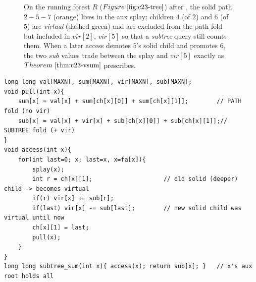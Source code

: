 \begin{figure}[H]
\centering
{}
\caption{On the running forest \(R\) (\(\figref{c23-tree}\)) after ,
the solid path \(2\!-\!5\!-\!7\) (orange) lives in the aux splay; children \(4\) (of
\(2\)) and \(6\) (of \(5\)) are \emph{virtual} (dashed green) and are excluded from
the path fold but included in \(\mathit{vir}[2]\), \(\mathit{vir}[5]\) so that a
\emph{subtree} query still counts them. When a later access demotes \(5\)'s solid
child and promotes \(6\), the two \(\mathit{sub}\) values trade between the splay and
\(\mathit{vir}[5]\) exactly as \(\thmref{c23-vsum}\) prescribes.}
\label{fig:c23-virtual}
\end{figure}

\begin{lstlisting}[caption={Subtree-sum-capable LCT: path fold sum[] (solid only) and subtree fold sub[] (solid + virtual) kept side by side. access() now updates vir[] as children swap between solid and virtual. ASCII only}, label={lst:c23-subtree}]
long long val[MAXN], sum[MAXN], vir[MAXN], sub[MAXN];
void pull(int x){
    sum[x] = val[x] + sum[ch[x][0]] + sum[ch[x][1]];        // PATH fold (no vir)
    sub[x] = val[x] + vir[x] + sub[ch[x][0]] + sub[ch[x][1]];// SUBTREE fold (+ vir)
}
void access(int x){
    for(int last=0; x; last=x, x=fa[x]){
        splay(x);
        int r = ch[x][1];                    // old solid (deeper) child -> becomes virtual
        if(r) vir[x] += sub[r];
        if(last) vir[x] -= sub[last];        // new solid child was virtual until now
        ch[x][1] = last;
        pull(x);
    }
}
long long subtree_sum(int x){ access(x); return sub[x]; }   // x's aux root holds all
\end{lstlisting}

